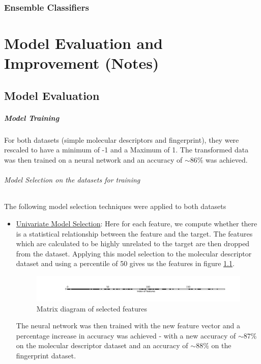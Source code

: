 \documentclass[a4paper,12pt]{report}
\begin{document}
		\subsection{Ensemble Classifiers}



\chapter{Model Evaluation and Improvement (Notes)}
	\section{Model Evaluation}
				\paragraph{Model Training}
				For both datasets (simple molecular descriptors and fingerprint), they were rescaled to have a minimum of -1 and a Maximum of 1. The transformed data was then trained on a neural network and an accuracy of $\sim86\%$ was achieved. \\
				\subparagraph{Model Selection on the datasets for training} 
				The following model selection techniques were applied to both datasets
				\begin{itemize}
					\item \underline{Univariate Model Selection}: Here for each feature, we compute whether there is a statistical relationship between the feature and the target. The features which are calculated to be highly unrelated to the target are then dropped from the dataset. Applying this model selection to the molecular descriptor dataset and using a percentile of 50 gives us the features in figure \ref{fig:neuralnetworksmdunivariate}.
					\begin{figure}[h]
						\centering
						\includegraphics[width=\textwidth,scale=1]{images/neural_network_smd_univariate_matrix}
						\caption{Matrix diagram of selected features}
						\label{fig:neuralnetworksmdunivariate}
					\end{figure}
					The neural network was then trained with the new feature vector and a percentage increase in accuracy was achieved - with a new accuracy of $\sim87\%$ on the molecular descriptor dataset and an accuracy of $\sim88\%$ on the fingerprint dataset.
				\end{itemize}
\end{document}
